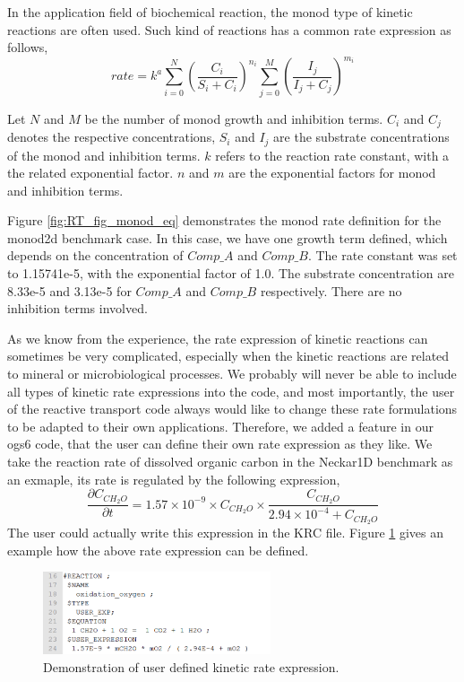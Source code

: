 In the application field of biochemical reaction, the monod type of kinetic reactions are often used. Such kind of reactions has a common rate expression as follows, 
\begin{equation}
rate = k^a \sum_{i=0}^{N} \left( \frac{C_i}{S_i + C_i} \right)^{n_i} \sum_{j=0}^{M} \left( \frac{I_j}{I_j + C_j} \right)^{m_i} 
\end{equation}

Let $N$ and $M$ be the number of monod growth and inhibition terms. $C_i$ and $C_j$ denotes the respective concentrations, $S_i$ and $I_j$ are the substrate concentrations of the monod and inhibition terms. $k$ refers to the reaction rate constant, with a the related exponential factor. $n$ and $m$ are the exponential factors for monod and inhibition terms. 

Figure \ref{fig:RT_fig_monod_eq} demonstrates the monod rate definition for the monod2d benchmark case. In this case, we have one growth term defined, which depends on the concentration of $Comp\_A$ and $Comp\_B$. The rate constant was set to 1.15741e-5, with the exponential factor of 1.0. The substrate concentration are 8.33e-5 and 3.13e-5 for $Comp\_A$ and $Comp\_B$ respectively. There are no inhibition terms involved. 

As we know from the experience, the rate expression of kinetic reactions can sometimes be very complicated, especially when the kinetic reactions are related to mineral or microbiological processes. We probably will never be able to include all types of kinetic rate expressions into the code, and most importantly, the user of the reactive transport code always would like to change these rate formulations to be adapted to their own applications. Therefore, we added a feature in our ogs6 code, that the user can define their own rate expression as they like. We take the reaction rate of dissolved organic carbon in the Neckar1D benchmark as an exmaple, its rate is regulated by the following expression, 
\begin{equation}
\frac{\partial C_{CH_2O}}{\partial t} = 1.57 \times 10^{-9} \times C_{CH_2O} \times \frac{C_{CH_2O}}{2.94 \times 10^{-4} + C_{CH_2O}}
\end{equation}
The user could actually write this expression in the KRC file.  Figure \ref{fig:RT_fig_user_exp} gives an example how the above rate expression can be defined. 

\begin{figure}
\includegraphics[width=0.6\textwidth]{RT/figs/RT_fig_user_exp}
\caption{Demonstration of user defined kinetic rate expression. }
\label{fig:RT_fig_user_exp}
\end{figure}

